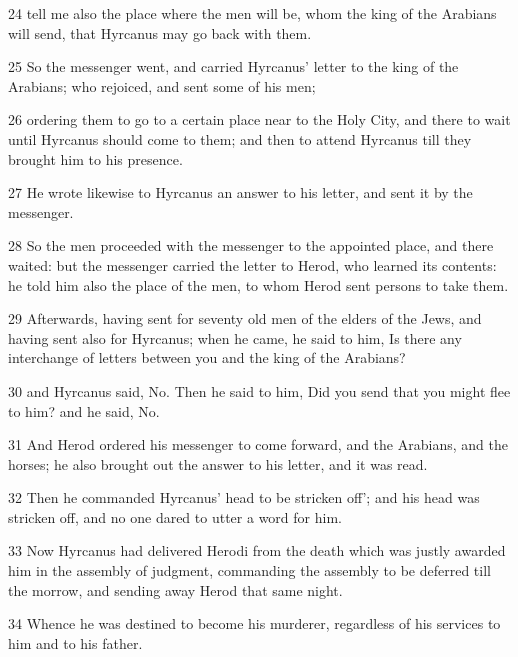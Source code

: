 \par 24 tell me also the place where the men will be, whom the king of the Arabians will send, that Hyrcanus may go back with them. 

\par 25 So the messenger went, and carried Hyrcanus’ letter to the king of the Arabians; who rejoiced, and sent some of his men; 

\par 26 ordering them to go to a certain place near to the Holy City, and there to wait until Hyrcanus should come to them; and then to attend Hyrcanus till they brought him to his presence. 

\par 27 He wrote likewise to Hyrcanus an answer to his letter, and sent it by the messenger. 

\par 28 So the men proceeded with the messenger to the appointed place, and there waited: but the messenger carried the letter to Herod, who learned its contents: he told him also the place of the men, to whom Herod sent persons to take them. 

\par 29 Afterwards, having sent for seventy old men of the elders of the Jews, and having sent also for Hyrcanus; when he came, he said to him, Is there any interchange of letters between you and the king of the Arabians? 

\par 30 and Hyrcanus said, No. Then he said to him, Did you send that you might flee to him? and he said, No. 

\par 31 And Herod ordered his messenger to come forward, and the Arabians, and the horses; he also brought out the answer to his letter, and it was read. 

\par 32 Then he commanded Hyrcanus’ head to be stricken off'; and his head was stricken off, and no one dared to utter a word for him. 

\par 33 Now Hyrcanus had delivered Herodi from the death which was justly awarded him in the assembly of judgment, commanding the assembly to be deferred till the morrow, and sending away Herod that same night. 

\par 34 Whence he was destined to become his murderer, regardless of his services to him and to his father. 

